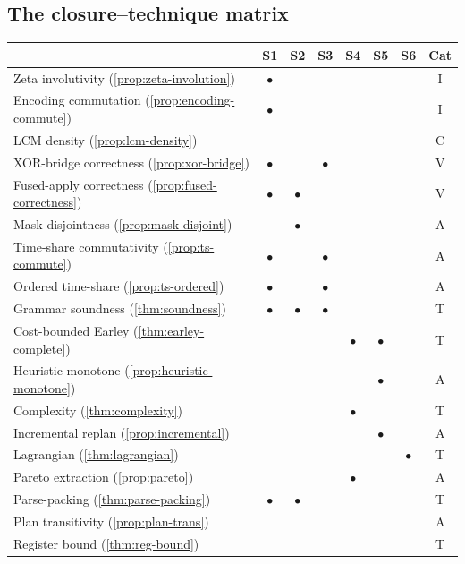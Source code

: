 \subsection{The closure--technique matrix}

\begin{center}
\scriptsize
\begin{tabular}{l|cccccc|c}
 & S1 & S2 & S3 & S4 & S5 & S6 & Cat \\
\hline
Zeta involutivity (\ref{prop:zeta-involution}) &
  $\bullet$ & & & & & & I \\
Encoding commutation (\ref{prop:encoding-commute}) &
  $\bullet$ & & & & & & I \\
LCM density (\ref{prop:lcm-density}) &
  & & & & & & C \\
XOR-bridge correctness (\ref{prop:xor-bridge}) &
  $\bullet$ & & $\bullet$ & & & & V \\
Fused-apply correctness (\ref{prop:fused-correctness}) &
  $\bullet$ & $\bullet$ & & & & & V \\
Mask disjointness (\ref{prop:mask-disjoint}) &
  & $\bullet$ & & & & & A \\
Time-share commutativity (\ref{prop:ts-commute}) &
  $\bullet$ & & $\bullet$ & & & & A \\
Ordered time-share (\ref{prop:ts-ordered}) &
  $\bullet$ & & $\bullet$ & & & & A \\
Grammar soundness (\ref{thm:soundness}) &
  $\bullet$ & $\bullet$ & $\bullet$ & & & & T \\
Cost-bounded Earley (\ref{thm:earley-complete}) &
  & & & $\bullet$ & $\bullet$ & & T \\
Heuristic monotone (\ref{prop:heuristic-monotone}) &
  & & & & $\bullet$ & & A \\
Complexity (\ref{thm:complexity}) &
  & & & $\bullet$ & & & T \\
Incremental replan (\ref{prop:incremental}) &
  & & & & $\bullet$ & & A \\
Lagrangian (\ref{thm:lagrangian}) &
  & & & & & $\bullet$ & T \\
Pareto extraction (\ref{prop:pareto}) &
  & & & $\bullet$ & & & A \\
Parse-packing (\ref{thm:parse-packing}) &
  $\bullet$ & $\bullet$ & & & & & T \\
Plan transitivity (\ref{prop:plan-trans}) &
  & & & & & & A \\
Register bound (\ref{thm:reg-bound}) &
  & & & & & & T \\
\end{tabular}
\end{center}

